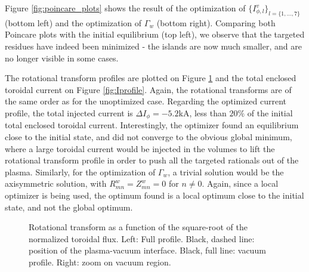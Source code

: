 \documentclass[my_thesis.tex]{subfiles}
\begin{document}
Figure \ref{fig:poincare_plots} shows the result of the optimization of $\{I^v_{\phi,l}\}_{l=\{1,\ldots,7\}}$ (bottom left) and the optimization of $\Gamma_w$ (bottom right). Comparing both Poincare plots with the initial equilibrium (top left), we observe that the targeted residues have indeed been minimized - the islands are now much smaller, and are no longer visible in some cases.

The rotational transform profiles are plotted on Figure \ref{fig:iota_profile} and the total enclosed toroidal current on Figure \ref{fig:Iprofile}. Again, the rotational transforms are of the same order as for the unoptimized case. Regarding the optimized current profile, the total injected current is $\Delta I_\phi=-5.2$kA, less than $20\%$ of the initial total enclosed toroidal current. Interestingly, the optimizer found an equilibrium close to the initial state, and did not converge to the obvious global minimum, where a large toroidal current would be injected in the volumes to lift the rotational transform profile in order to push all the targeted rationals out of the plasma. Similarly, for the optimization of $\Gamma_w$, a trivial solution would be the axisymmetric solution, with $R^w_{mn}=Z^w_{mn}=0$ for $n\neq 0$. Again, since a local optimizer is being used, the optimum found is a local optimum close to the initial state, and not the global optimum.

\begin{figure}
    \centering
    \hfill
    \hfill
    \hfill
    \caption{Rotational transform as a function of the square-root of the normalized toroidal flux. Left: Full profile. Black, dashed line: position of the plasma-vacuum interface. Black, full line: vacuum profile. Right: zoom on vacuum region.}
    \label{fig:iota_profile}
\end{figure}
\end{document}

